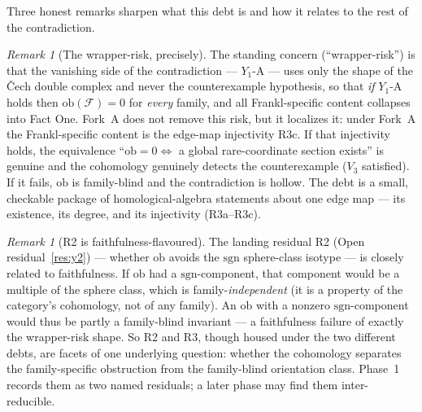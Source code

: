 \documentclass[11pt,oneside]{amsart}
\theoremstyle{plain}
\theoremstyle{definition}
\theoremstyle{remark}
\newtheorem{remark}[theorem]{Remark}
\theoremstyle{honeststyle}
\newcommand{\F}{\mathcal{F}}
\newcommand{\sgn}{\mathrm{sgn}}
\newcommand{\ob}{\mathrm{ob}}
\begin{document}
Three honest remarks sharpen what this debt is and how it relates to
the rest of the contradiction.

\begin{remark}[The wrapper-risk, precisely]
\label{rem:wrapper}
The standing concern (``wrapper-risk'') is that the vanishing side of
the contradiction --- $Y_1$-A --- uses only the shape of the \v{C}ech
double complex and never the counterexample hypothesis, so that
\emph{if} $Y_1$-A holds then $\ob(\F)=0$ for \emph{every} family, and
all Frankl-specific content collapses into Fact One. Fork~A does not
remove this risk, but it localizes it: under Fork~A the
Frankl-specific content is the edge-map injectivity R3c. If that
injectivity holds, the equivalence ``$\ob=0\iff$ a global
rare-coordinate section exists'' is genuine and the cohomology
genuinely detects the counterexample ($V_3$ satisfied). If it fails,
$\ob$ is family-blind and the contradiction is hollow. The debt is a
small, checkable package of homological-algebra statements about one
edge map --- its existence, its degree, and its injectivity
(R3a--R3c).
\end{remark}

\begin{remark}[R2 is faithfulness-flavoured]
\label{rem:r2-faithful}
The landing residual R2 (Open residual~\ref{res:y2}) --- whether
$\ob$ avoids the $\sgn$ sphere-class isotype --- is closely related to
faithfulness. If $\ob$ had a $\sgn$-component, that component would be
a multiple of the sphere class, which is family-\emph{independent}
(it is a property of the category's cohomology, not of any family). An
$\ob$ with a nonzero $\sgn$-component would thus be partly a
family-blind invariant --- a faithfulness failure of exactly the
wrapper-risk shape. So R2 and R3, though housed under the two
different debts, are facets of one underlying question: whether the
cohomology separates the family-specific obstruction from the
family-blind orientation class. Phase~1 records them as two named
residuals; a later phase may find them inter-reducible.
\end{remark}
\end{document}
